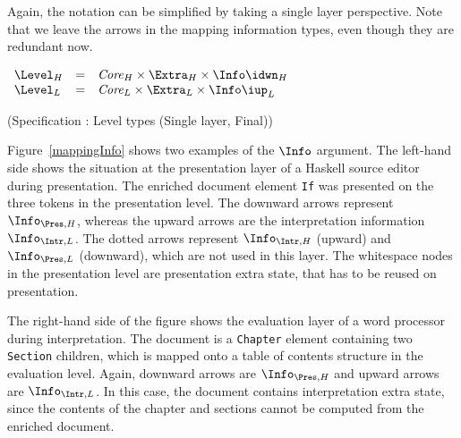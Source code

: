 \bc
Again, the notation can be simplified by taking a single layer perspective. Note that we leave the arrows in the  mapping information types, even though they are redundant now.

\begin{small}
 \label{spec:levelSingleFinal}
\(\begin{array}{lcll} \label{spec:extraStateSL}
\Level_{H} & = & \Core_{H} \times \Extra_{H} \times \Info\idwn_{H}\\
\Level_{L} & = & \Core_{L} \times \Extra_{L} \times \Info\iup_{L}\\
\end{array}\)\end{small}
\begin{center}(Specification \thespecification: Level types (Single layer, Final))\end{center}\vspace{1em}
\ec

\bc
Figure~\ref{mappingInfo} shows two examples of the $\Info$ argument. The left-hand side shows the situation at the presentation layer of a Haskell source editor during presentation.  The enriched document element \verb|If|  was presented on the three tokens in the presentation level. The downward arrows represent $\Info_{\Pres,H}$, whereas the upward arrows are the interpretation information $\Info_{\Intr, L}$. The dotted arrows represent $\Info_{\Intr,H}$ (upward) and $\Info_{\Pres,L}$ (downward), which are not used in this layer. The whitespace nodes in the presentation level are presentation extra state, that has to be reused on presentation. 

The right-hand side of the figure shows the evaluation layer of a word processor during interpretation. The document is a \verb|Chapter| element containing two \verb|Section| children, which is mapped onto a table of contents structure in the evaluation level. Again, downward arrows are $\Info_{\Pres,H}$ and upward arrows are $\Info_{\Intr,L}$.  In this case, the document contains interpretation extra state, since the contents of the chapter and sections cannot be computed from the enriched document.  


